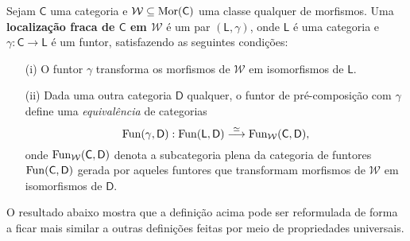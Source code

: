 \begin{defin}\label{defin:localizacao_fraca}
  Sejam $\mathsf{C}$ uma categoria e $\mathcal{W} \subseteq \mathrm{Mor}(\mathsf{C})$ uma classe qualquer de morfismos.
  Uma \textbf{localização fraca de $\mathsf{C}$ em $\mathcal{W}$} é um par $(\mathsf{L},\gamma)$, onde $\mathsf{L}$ é uma categoria e $\gamma: \mathsf{C} \to \mathsf{L}$ é um funtor, satisfazendo as seguintes condições:
  \begin{enumerate}
  \item[(i)] O funtor $\gamma$ transforma os morfismos de $\mathcal{W}$ em isomorfismos de $\mathsf{L}$.
    
  \item[(ii)] Dada uma outra categoria $\mathsf{D}$ qualquer, o funtor de pré-composição com $\gamma$ define uma \emph{equivalência} de categorias
    \begin{displaymath}
      \mathrm{Fun}(\gamma,\mathsf{D}): \mathrm{Fun}(\mathsf{L},\mathsf{D}) \overset{\simeq}{\longrightarrow} \mathrm{Fun}_{\mathcal{W}}(\mathsf{C},\mathsf{D}),
    \end{displaymath}
    onde $\mathrm{Fun}_{\mathcal{W}}(\mathsf{C},\mathsf{D})$ denota a subcategoria plena da categoria de funtores $\mathrm{Fun}(\mathsf{C},\mathsf{D})$ gerada por aqueles funtores que transformam morfismos de $\mathcal{W}$ em isomorfismos de $\mathsf{D}$.
  \end{enumerate}
\end{defin}

O resultado abaixo mostra que a definição acima pode ser reformulada de forma a ficar mais similar a outras definições feitas por meio de propriedades universais.

